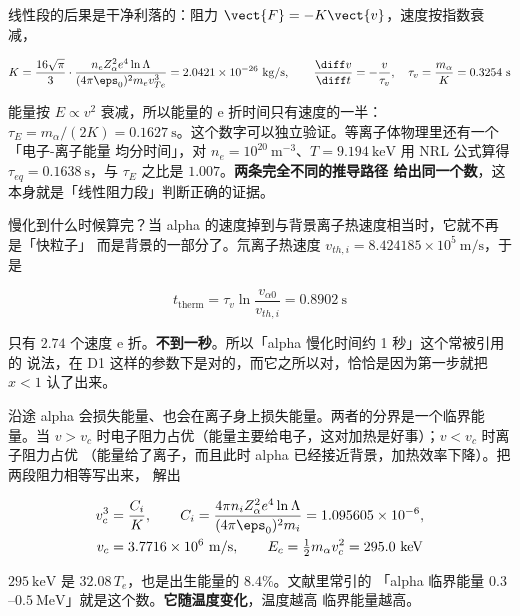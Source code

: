 线性段的后果是干净利落的：阻力 $\vect{F}=-K\vect{v}$，速度按指数衰减，

\begin{equation}
K = \frac{16\sqrt{\pi}}{3}\cdot\frac{n_e Z_\alpha^2 e^4 \ln\Lambda}
{(4\pi\eps_0)^2 m_e v_{Te}^3} = 2.0421\times10^{-26}\ \mathrm{kg/s},
\qquad
\frac{\diff v}{\diff t} = -\frac{v}{\tau_v},\quad
\tau_v=\frac{m_\alpha}{K}=0.3254\ \mathrm{s}
\label{eq:app-w-tauv}
\end{equation}

能量按 $E\propto v^2$ 衰减，所以能量的 e 折时间只有速度的一半：$\tau_E=m_\alpha/(2K)
=0.1627\ \mathrm{s}$。这个数字可以独立验证。等离子体物理里还有一个「电子-离子能量
均分时间」，对 $n_e=10^{20}\ \mathrm{m^{-3}}$、$T=9.194\ \mathrm{keV}$ 用 NRL 公式算得
$\tau_{eq}=0.1638\ \mathrm{s}$，与 $\tau_E$ 之比是 $1.007$。\textbf{两条完全不同的推导路径
给出同一个数}，这本身就是「线性阻力段」判断正确的证据。

慢化到什么时候算完？当 alpha 的速度掉到与背景离子热速度相当时，它就不再是「快粒子」
而是背景的一部分了。氘离子热速度 $v_{th,i}=8.424185\times10^{5}\ \mathrm{m/s}$，于是

\begin{equation}
t_{\text{therm}} = \tau_v \ln\frac{v_{\alpha 0}}{v_{th,i}} = 0.8902\ \mathrm{s}
\label{eq:app-w-therm}
\end{equation}

只有 $2.74$ 个速度 e 折。\textbf{不到一秒}。所以「alpha 慢化时间约 1 秒」这个常被引用的
说法，在 D1 这样的参数下是对的，而它之所以对，恰恰是因为第一步就把 $x<1$ 认了出来。

沿途 alpha 会损失能量、也会在离子身上损失能量。两者的分界是一个临界能量。当
$v>v_c$ 时电子阻力占优（能量主要给电子，这对加热是好事）；$v<v_c$ 时离子阻力占优
（能量给了离子，而且此时 alpha 已经接近背景，加热效率下降）。把两段阻力相等写出来，
解出

\begin{equation}
\begin{aligned}
v_c^3 &= \frac{C_i}{K}, \qquad
C_i = \frac{4\pi n_i Z_\alpha^2 e^4 \ln\Lambda}{(4\pi\eps_0)^2 m_i}
= 1.095605\times10^{-6},\\
v_c &= 3.7716\times10^{6}\ \mathrm{m/s}, \qquad
E_c = \tfrac12 m_\alpha v_c^2 = 295.0\ \mathrm{keV}
\end{aligned}
\label{eq:app-w-vc}
\end{equation}

$295\ \mathrm{keV}$ 是 $32.08\,T_e$，也是出生能量的 $8.4\%$。文献里常引的
「alpha 临界能量 $0.3$--$0.5\ \mathrm{MeV}$」就是这个数。\textbf{它随温度变化}，温度越高
临界能量越高。

